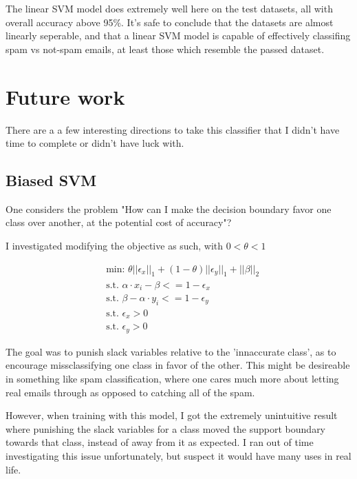 \documentclass[]{article}
\begin{document}
The linear SVM model does extremely well here on the test datasets, all with overall accuracy above 95\%. It's safe to conclude that the datasets are almost linearly seperable, and that a linear SVM model is capable of effectively classifing spam vs not-spam emails, at least those which resemble the passed dataset.

\section{Future work}
There are a a few interesting directions to take this classifier that I didn't have time to complete or didn't have luck with.

\subsection{Biased SVM}

One considers the problem "How can I make the decision boundary favor one class over another, at the potential cost of accuracy"?

I investigated modifying the objective as such, with $0 < \theta < 1$

\begin{equation}
\begin{split}
&\text{min: } \theta||\epsilon_x||_1 + (1 - \theta)||\epsilon_y||_1 + ||\beta||_2
\\
&\text{s.t. } \alpha \cdot x_i - \beta <= 1 - \epsilon_x
\\
&\text{s.t. } \beta - \alpha \cdot y_i  <= 1 - \epsilon_y
\\
&\text{s.t. } \epsilon_x > 0
\\
&\text{s.t. } \epsilon_y > 0
\end{split}
\end{equation}

The goal was to punish slack variables relative to the 'innaccurate class', as to encourage missclassifying one class in favor of the other. This might be desireable in something like spam classification, where one cares much more about letting real emails through  as opposed to catching all of the spam.

However, when training with this model, I got the extremely unintuitive result where punishing the slack variables for a class moved the support boundary towards that class, instead of away from it as expected. I ran out of time investigating this issue unfortunately, but suspect it would have many uses in real life.
\end{document}

